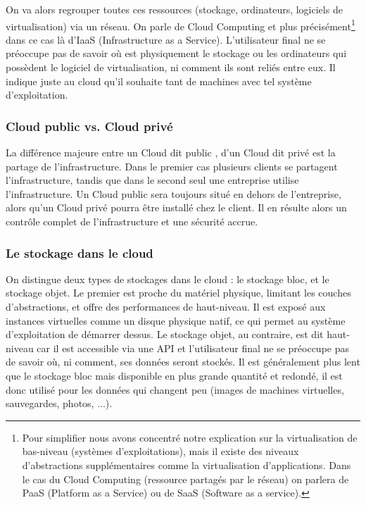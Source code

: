 \documentclass{report}
\begin{document}
On va alors regrouper toutes ces ressources (stockage, ordinateurs, logiciels de virtualisation) via un réseau. On parle de Cloud Computing et plus précisément\footnote{Pour simplifier nous avons concentré notre explication sur la virtualisation de bas-niveau (systèmes d’exploitations), mais il existe des niveaux d’abstractions supplémentaires comme la virtualisation d’applications. Dans le cas du Cloud Computing (ressource partagés par le réseau) on parlera de PaaS (Platform as a Service) ou de SaaS (Software as a service).} dans ce cas là d’IaaS (Infrastructure as a Service).
L’utilisateur final ne se préoccupe pas de savoir où est physiquement le stockage ou les ordinateurs qui possèdent le logiciel de virtualisation, ni comment ils sont reliés entre eux. Il indique juste au cloud qu’il souhaite tant de machines avec tel système d’exploitation.

\subsubsection{Cloud public vs. Cloud privé}
La différence majeure entre un Cloud dit \og public \fg, d'un Cloud dit \og privé \fg est la partage de l'infrastructure. Dans le premier cas plusieurs clients se partagent l'infrastructure, tandis que dans le second seul une entreprise utilise l'infrastructure.\newline
Un Cloud public sera toujours situé en dehors de l'entreprise, alors qu'un Cloud privé pourra être installé chez le client. Il en résulte alors un contrôle complet de l'infrastructure et une sécurité accrue.

\subsubsection{Le stockage dans le cloud}
On distingue deux types de stockages dans le cloud : le stockage bloc, et le stockage objet. Le premier est proche du matériel physique, limitant les couches d'abstractions, et offre des performances de haut-niveau. Il est exposé aux instances virtuelles comme un disque physique natif, ce qui permet au système d'exploitation de démarrer dessus.\newline
Le stockage objet, au contraire, est dit \og haut-niveau \fg car il est accessible via une API et l'utilisateur final ne se préoccupe pas de savoir où, ni comment, ses données seront stockés. Il est généralement plus lent que le stockage bloc mais disponible en plus grande quantité et redondé, il est donc utilisé pour les données qui changent peu (images de machines virtuelles, sauvegardes, photos, ...).
\newpage
\end{document}
